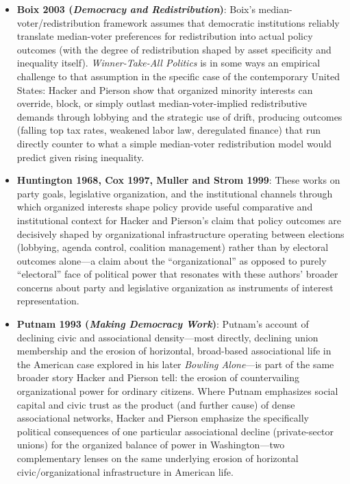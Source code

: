 \documentclass[12pt]{article}
\begin{document}
\begin{itemize}[leftmargin=*, itemsep=4pt]
    \item \textbf{Boix 2003 (\textit{Democracy and Redistribution})}: Boix's median-voter/redistribution framework assumes that democratic institutions reliably translate median-voter preferences for redistribution into actual policy outcomes (with the degree of redistribution shaped by asset specificity and inequality itself). \textit{Winner-Take-All Politics} is in some ways an empirical challenge to that assumption in the specific case of the contemporary United States: Hacker and Pierson show that organized minority interests can override, block, or simply outlast median-voter-implied redistributive demands through lobbying and the strategic use of drift, producing outcomes (falling top tax rates, weakened labor law, deregulated finance) that run directly counter to what a simple median-voter redistribution model would predict given rising inequality.
    \item \textbf{Huntington 1968, Cox 1997, Muller and Strom 1999}: These works on party goals, legislative organization, and the institutional channels through which organized interests shape policy provide useful comparative and institutional context for Hacker and Pierson's claim that policy outcomes are decisively shaped by organizational infrastructure operating between elections (lobbying, agenda control, coalition management) rather than by electoral outcomes alone---a claim about the ``organizational'' as opposed to purely ``electoral'' face of political power that resonates with these authors' broader concerns about party and legislative organization as instruments of interest representation.
    \item \textbf{Putnam 1993 (\textit{Making Democracy Work})}: Putnam's account of declining civic and associational density---most directly, declining union membership and the erosion of horizontal, broad-based associational life in the American case explored in his later \textit{Bowling Alone}---is part of the same broader story Hacker and Pierson tell: the erosion of countervailing organizational power for ordinary citizens. Where Putnam emphasizes social capital and civic trust as the product (and further cause) of dense associational networks, Hacker and Pierson emphasize the specifically political consequences of one particular associational decline (private-sector unions) for the organized balance of power in Washington---two complementary lenses on the same underlying erosion of horizontal civic/organizational infrastructure in American life.
\end{itemize}
\end{document}
